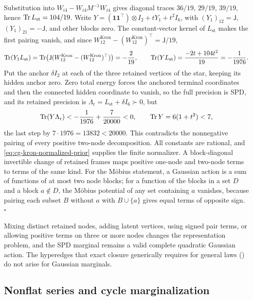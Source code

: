 Substitution into \(W_{i4}-W_{i4}M^{-1}W_{i4}\) gives diagonal traces
\(36/19\), \(29/19\), \(39/19\), hence \(\operatorname{Tr} L_{\mathrm{st}}=104/19\). Write
\(Y=(\mathbf1\mathbf1^\top)\otimes I_2+tY_1+t^2I_6\), with
\((Y_1)_{12}=\mathsf J\), \((Y_1)_{21}=-\mathsf J\), and other blocks zero. The
constant-vector kernel of \(L_{\mathrm{st}}\) makes the first pairing vanish,
and since
\(W^{\mathrm{Kron}}_{12}-(W^{\mathrm{Kron}}_{12})^\top=\mathsf J/19\),
\begin{equation}
\operatorname{Tr}(Y_1L_{\mathrm{st}})
=\operatorname{Tr}\bigl(\mathsf J(W^{\mathrm{Kron}}_{12}-(W^{\mathrm{Kron}}_{12})^\top)\bigr)=-\frac2{19},
\qquad
\operatorname{Tr}(YL_{\mathrm{st}})=\frac{-2t+104t^2}{19}=-\frac1{1976}.
\label{eq:cg-kron-negative-dual-pairing}
\end{equation}
Put the anchor \(\delta I_2\) at each of the three retained vertices of the
star, keeping its hidden anchor zero. Zero total energy forces the anchored
terminal coordinates and then the connected hidden coordinate to vanish, so the
full precision is SPD, and its retained precision is
\(\Lambda_{\mathrm r}=L_{\mathrm{st}}+\delta I_6\succ0\), but
\begin{equation}
\operatorname{Tr}(Y\Lambda_{\mathrm r})<-\frac1{1976}+\frac7{20000}<0,
\qquad
\operatorname{Tr} Y=6(1+t^2)<7,
\label{eq:cg-kron-proper-dual-obstruction}
\end{equation}
the last step by \(7\cdot1976=13832<20000\). This contradicts the nonnegative
pairing of every positive two-node decomposition. All constants are rational,
and \eqref{eq:cg-kron-normalized-prior} supplies the finite normalizer. A
block-diagonal invertible change of retained frames maps positive one-node and
two-node terms to terms of the same kind. For the M\"obius statement, a Gaussian
action is a sum of functions of at most two node blocks; for a function of the
blocks in a set \(D\) and a block \(a\notin D\), the M\"obius potential of any
set containing \(a\) vanishes, because pairing each subset \(B\) without \(a\)
with \(B\cup\{a\}\) gives equal terms of opposite sign. \(\square\)

Mixing distinct retained nodes, adding latent vertices, using signed pair terms,
or allowing positive terms on three or more nodes changes the representation
problem, and the SPD marginal remains a valid complete quadratic Gaussian
action. The hyperedges that exact closure generically requires for general laws
() do not arise for Gaussian marginals.

\subsection{Nonflat series and cycle marginalization}
\label{sec:cg-nonflat-series-kron}

